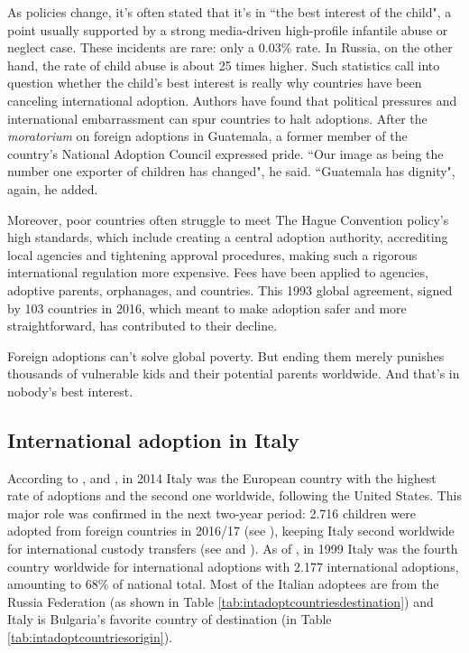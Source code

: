 As policies change, it's often stated that it's in ``the best interest of the child", a point usually supported by a strong media-driven high-profile infantile abuse or neglect case. These incidents are rare: only a 0.03\% rate. In Russia, on the other hand, the rate of child abuse is about 25 times higher. Such statistics call into question whether the child's best interest is really why countries have been canceling international adoption. Authors have found that political pressures and international embarrassment can spur countries to halt adoptions. After the \textit{moratorium} on foreign adoptions in Guatemala, a former member of the country's National Adoption Council expressed pride. ``Our image as being the number one exporter of children has changed", he said. ``Guatemala has dignity", again, he added.

Moreover, poor countries often struggle to meet The Hague Convention policy's high standards, which include creating a central adoption authority, accrediting local agencies and tightening approval procedures, making such a rigorous international regulation more expensive. Fees have been applied to agencies, adoptive parents, orphanages, and countries. This 1993 global agreement, signed by 103 countries in 2016, which meant to make adoption safer and more straightforward, has contributed to their decline.

Foreign adoptions can't solve global poverty. But ending them merely punishes thousands of vulnerable kids and their potential parents worldwide. And that's in nobody's best interest.

\subsection{International adoption in Italy}\label{sub:intadoptioninitaly}
According to \cite{notonlyinfectious}, \cite{nonsoloinfezioni} and \cite{cai2014}, in 2014 Italy was the European country with the highest rate of adoptions and the second one worldwide, following the United States. This major role was confirmed in the next two-year period: 2.716 children were adopted from foreign countries in 2016/17 (see \cite{cai2016}), keeping Italy second worldwide for international custody transfers (see \cite{adoptdropping_article} and \cite{adoptdropping_book}).
As of \cite{unreport}, in 1999 Italy was the fourth country worldwide for international adoptions with 2.177 international adoptions, amounting to 68\% of national total. Most of the Italian adoptees are from the Russia Federation (as shown in Table \ref{tab:intadoptcountriesdestination}) and Italy is Bulgaria's favorite country of destination (in Table \ref{tab:intadoptcountriesorigin}).

